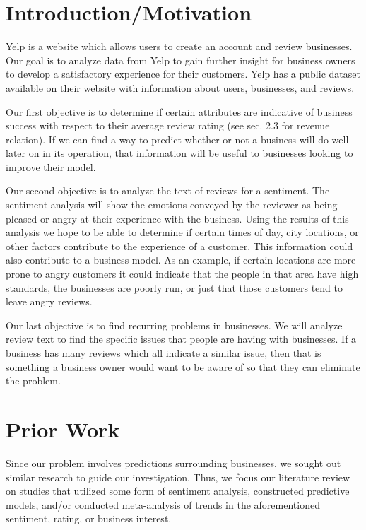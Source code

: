 
\section{Introduction/Motivation}

\quad Yelp is a website which allows users to create an account and review businesses. Our goal is to analyze data from Yelp to gain further insight for business owners to develop a satisfactory experience for their customers. Yelp has a public dataset available on their website with information about users, businesses, and reviews.

\quad Our first objective is to determine if certain attributes are indicative of business success with respect to their average review rating (see sec. 2.3 for revenue relation). If we can find a way to predict whether or not a business will do well later on in its operation, that information will be useful to businesses looking to improve their model.

\quad Our second objective is to analyze the text of reviews for a sentiment. The sentiment analysis will show the emotions conveyed by the reviewer as being pleased or angry at their experience with the business. Using the results of this analysis we hope to be able to determine if certain times of day, city locations, or other factors contribute to the experience of a customer. This information could also contribute to a business model. As an example, if certain locations are more prone to angry customers it could indicate that the people in that area have high standards, the businesses are poorly run, or just that those customers tend to leave angry reviews.

\quad Our last objective is to find recurring problems in businesses. We will analyze review text to find the specific issues that people are having with businesses. If a business has many reviews which all indicate a similar issue, then that is something a business owner would want to be aware of so that they can eliminate the problem.

\section{Prior Work}

Since our problem involves predictions surrounding businesses, we sought out similar research to guide our investigation. Thus, we focus our literature review on studies that utilized some form of sentiment analysis, constructed predictive models, and/or conducted meta-analysis of trends in the aforementioned sentiment, rating, or business interest.

